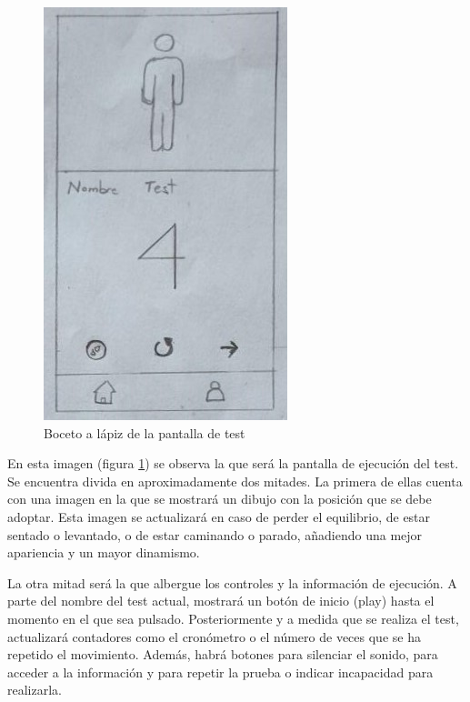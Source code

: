 \begin{figure}[H]
	\centering
	\includegraphics[scale=1]{imagenes/boceto_test.jpg}
	\caption{Boceto a lápiz de la pantalla de test\label{fig:boceto_test}}
\end{figure}

En esta imagen (figura \ref{fig:boceto_test}) se observa la que será la pantalla de ejecución del test. Se encuentra divida en aproximadamente dos mitades. La primera de ellas cuenta con una imagen en la que se mostrará un dibujo con la posición que se debe adoptar. Esta imagen se actualizará en caso de perder el equilibrio, de estar sentado o levantado, o de estar caminando o parado, añadiendo una mejor apariencia y un mayor dinamismo.

La otra mitad será la que albergue los controles y la información de ejecución. A parte del nombre del test actual, mostrará un botón de inicio (play) hasta el momento en el que sea pulsado. Posteriormente y a medida que se realiza el test, actualizará contadores como el cronómetro o el número de veces que se ha repetido el movimiento. Además, habrá botones para silenciar el sonido, para acceder a la información y para repetir la prueba o indicar incapacidad para realizarla.

